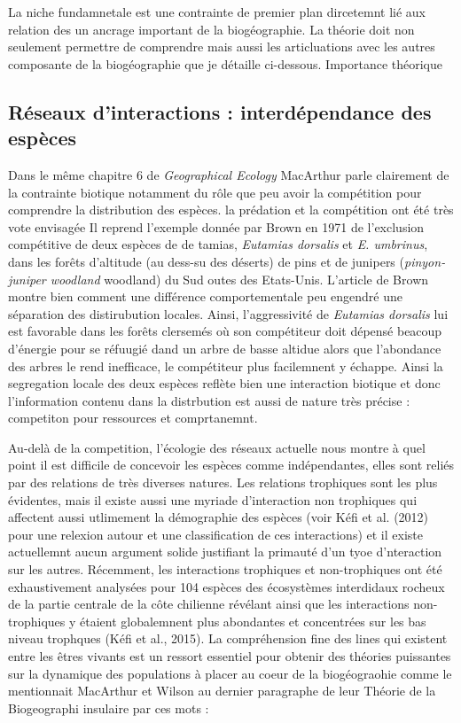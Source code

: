 La niche fundamnetale est une contrainte de premier plan dircetemnt lié
aux relation des un ancrage important de la biogéographie. La théorie
doit non seulement permettre de comprendre mais aussi les articluations
avec les autres composante de la biogéographie que je détaille
ci-dessous. Importance théorique

\subsection*{Réseaux d'interactions : interdépendance des
espèces}\label{ruxe9seaux-dinteractions-interduxe9pendance-des-espuxe8ces}

Dans le même chapitre 6 de \emph{Geographical Ecology} MacArthur parle
clairement de la contrainte biotique notamment du rôle que peu avoir la
compétition pour comprendre la distribution des espèces. la prédation et
la compétition ont été très vote envisagée Il reprend l'exemple donnée
par Brown en 1971 de l'exclusion compétitive de deux espèces de de
tamias, \emph{Eutamias dorsalis} et \emph{E. umbrinus}, dans les forêts
d'altitude (au dess-su des déserts) de pins et de junipers
(\emph{pinyon-juniper woodland} woodland) du Sud outes des Etats-Unis.
L'article de Brown montre bien comment une différence comportementale
peu engendré une séparation des distirubution locales. Ainsi,
l'aggressivité de \emph{Eutamias dorsalis} lui est favorable dans les
forêts clersemés où son compétiteur doit dépensé beacoup d'énergie pour
se réfuugié dand un arbre de basse altidue alors que l'abondance des
arbres le rend inefficace, le compétiteur plus facilemnent y échappe.
Ainsi la segregation locale des deux espèces reflète bien une
interaction biotique et donc l'information contenu dans la distrbution
est aussi de nature très précise : competiton pour ressources et
comprtanemnt.

Au-delà de la competition, l'écologie des réseaux actuelle nous montre à
quel point il est difficile de concevoir les espèces comme
indépendantes, elles sont reliés par des relations de très diverses
natures. Les relations trophiques sont les plus évidentes, mais il
existe aussi une myriade d'interaction non trophiques qui affectent
aussi utlimement la démographie des espèces (voir Kéfi et al. (2012)
pour une relexion autour et une classification de ces interactions) et
il existe actuellemnt aucun argument solide justifiant la primauté d'un
tyoe d'nteraction sur les autres. Récemment, les interactions trophiques
et non-trophiques ont été exhaustivement analysées pour 104 espèces des
écosystèmes interdidaux rocheux de la partie centrale de la côte
chilienne révélant ainsi que les interactions non-trophiques y étaient
globalemnent plus abondantes et concentrées sur les bas niveau trophques
(Kéfi et al., 2015). La compréhension fine des lines qui existent entre
les êtres vivants est un ressort essentiel pour obtenir des théories
puissantes sur la dynamique des populations à placer au coeur de la
biogéograohie comme le mentionnait MacArthur et Wilson au dernier
paragraphe de leur Théorie de la Biogeographi insulaire par ces mots :

